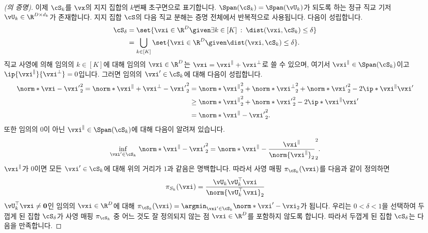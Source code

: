 \documentclass[../../book-main_ko.tex]{subfiles}
\begin{document}
\begin{proof}[(의 증명)]
    이제 \(\cS_k\)를 \(\vx\)의 지지 집합의 \(k\)번째 초구면으로 표기합니다.
    \(\Span(\cS_k) = \Span(\vU_k)\)가 되도록 하는 정규 직교 기저 \(\vU_{k} \in \R^{D \times d_k}\)가 존재합니다.
    지지 집합 \(\cS\)의 다음 직교 분해는 증명 전체에서 반복적으로 사용됩니다.
    다음이 성립합니다.
    \begin{align}
        \cS_{\delta}
        &= \set{\vxi \in \R^D \given \exists k \in [K] \::\: \dist(\vxi,
        \cS_k) \leq \delta}
        \\
        &= \bigcup_{k \in [K]} \set{\vxi \in \R^D \given \dist(\vxi,
        \cS_k) \leq \delta}.
    \end{align}
    직교 사영에 의해 임의의 \(k \in [K]\)에 대해 임의의 \(\vxi \in \R^D\)는 \(\vxi = \vxi^{\|} + \vxi^{\perp}\)로 쓸 수 있으며, 여기서 \(\vxi^{\|} \in \Span(\cS_k)\)이고 \(\ip{\vxi^{\|}}{\vxi^\perp} = 0\)입니다.
    그러면 임의의 \(\vxi' \in \cS_k\)에 대해 다음이 성립합니다.
    \begin{align}
        \norm*{\vxi - \vxi'}_2^2
        =
        \norm*{\vxi^{\|} + \vxi^{\perp} - \vxi'}_2^2
        &=
        \norm*{\vxi^{\|}}_2^2 + \norm*{\vxi^{\perp}}_2^2 + \norm*{\vxi'}_2^2
        - 2 \ip*{\vxi^{\|}}{\vxi'}
        \\
        &\geq
        \norm*{\vxi^{\|}}_2^2 + \norm*{\vxi'}_2^2
        - 2 \ip*{\vxi^{\|}}{\vxi'}
        \\
        &=
        \norm*{\vxi^{\|} - \vxi'}_2^2.
    \end{align}
    또한 임의의 0이 아닌 \(\vxi^{\|} \in \Span(\cS_k)\)에 대해 다음이 알려져 있습니다.
    \begin{equation}
        \inf_{\vxi' \in \cS_k}\,
        \norm*{\vxi^{\|} - \vxi'}_2^2
        =
        \norm*{\vxi^{\|} - \frac{\vxi^{\|}}{\norm{\vxi^{\|}}_2}}_2^2.
    \end{equation}
    \(\vxi^{\|}\)가 0이면 모든 \(\vxi' \in \cS_k\)에 대해 위의 거리가 \(1\)과 같음은 명백합니다.
    따라서 사영 매핑 \(\pi_{\cS_k}(\vxi)\)를 다음과 같이 정의하면
    \begin{equation}
        \pi_{S_k}(\vxi) = \frac{\vU_k\vU_k^\top \vxi}{\norm{\vU_k^\top \vxi}_2}
    \end{equation}
    \(\vU_k^\top \vxi \neq \mathbf{0}\)인 임의의 \(\vxi \in \R^D\)에 대해
    \(\pi_{\cS_k}(\vxi) = \argmin_{\vxi' \in \cS_k}\norm*{\vxi' - \vxi}_2\)가 됩니다.
    우리는 \(0 < \delta < 1\)을 선택하여 두껍게 된 집합 \(\cS_{\delta}\)가 사영 매핑 \(\pi_{\cS_k}\) 중 어느 것도 잘 정의되지 않는 점 \(\vxi \in \R^D\)를 포함하지 않도록 합니다.
    따라서 두껍게 된 집합 \(\cS_{\delta}\)는 다음을 만족합니다.

\end{proof}
\end{document}
